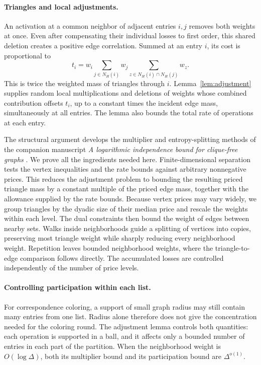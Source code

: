 \paragraph{Triangles and local adjustments.}
An activation at a common neighbor of adjacent entries $i,j$ removes
both weights at once. Even after compensating their individual losses
to first order, this shared deletion creates a positive edge
correlation. Summed at an entry $i$, its cost is proportional to
\[
 t_i=w_i\sum_{j\in N_H(i)}w_j
                 \sum_{z\in N_H(i)\cap N_H(j)}w_z.
\]
This is twice the weighted mass of triangles through $i$.
Lemma~\ref{lem:adjustment} supplies random local multiplications and
deletions of weights whose combined contribution offsets $t_i$, up to
a constant times the incident edge mass, simultaneously at all entries.
The lemma also bounds the total rate of operations at each entry.

The structural argument develops the multiplier and entropy-splitting
methods of the companion manuscript
\emph{A logarithmic independence bound for clique-free graphs}
\cite[Sections~2--5]{OpenAIIndependence}. We prove all the ingredients
needed here. Finite-dimensional separation tests the vertex inequalities
and the rate bounds against arbitrary nonnegative prices. This reduces
the adjustment problem to bounding the resulting priced triangle mass
by a constant multiple of the priced edge mass, together with the
allowance supplied by the rate bounds. Because vertex prices may vary
widely, we group triangles by the dyadic size of their median price and
rescale the weights within each level. The dual constraints then bound
the weight of edges between nearby sets. Walks inside neighborhoods
guide a splitting of vertices into copies, preserving most triangle
weight while sharply reducing every neighborhood weight. Repetition
leaves bounded neighborhood weights, where the triangle-to-edge
comparison follows directly. The accumulated losses are controlled
independently of the number of price levels.

\paragraph{Controlling participation within each list.}
For correspondence coloring, a support of small graph radius may still
contain many entries from one list. Radius alone therefore does not
give the concentration needed for the coloring round. The adjustment
lemma controls both quantities: each operation is supported in a ball,
and it affects only a bounded number of entries in each part of the
partition. When the neighborhood weight is $O(\log\Delta)$, both its
multiplier bound and its participation bound are $\Delta^{o(1)}$.

